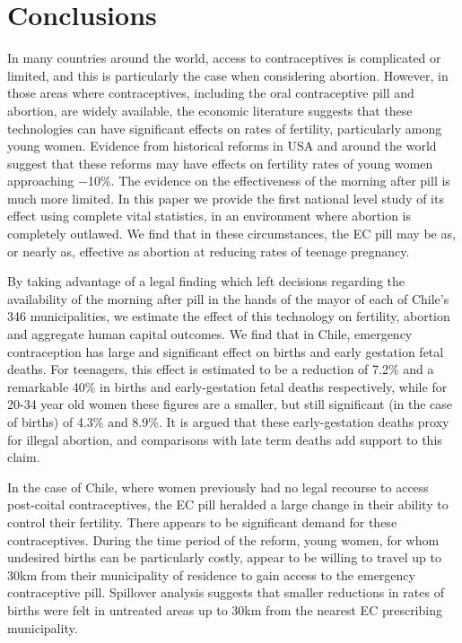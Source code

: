 \section{Conclusions}
\label{TEENscn:conclusion}
In many countries around the world, access to contraceptives is complicated or
limited, and this is particularly the case when considering abortion.  However,
in those areas where contraceptives, including the oral contraceptive pill and 
abortion, are widely available, the economic literature suggests that these
technologies can have significant effects on rates of fertility, particularly
among young women.  Evidence from historical reforms in USA and around the world
suggest that these reforms may have effects on fertility rates of young women 
approaching $-$10\%.  The evidence on the effectiveness of the morning after pill 
is much more limited.  In this paper we provide the first national level study of 
its effect using complete vital statistics, in an environment where abortion is 
completely outlawed. We find that in these circumstances, the EC pill may be as, 
or nearly as, effective as abortion at reducing rates of teenage pregnancy.

By taking advantage of a legal finding which left decisions regarding the 
availability of the morning after pill in the hands of the mayor of each of
Chile's 346 municipalities, we estimate the effect of this technology on 
fertility, abortion and aggregate human capital outcomes. We find that in Chile,
emergency contraception has large and significant effect on births and early 
gestation fetal deaths.  For teenagers, this effect is estimated to be a
reduction of 7.2\% and a remarkable 40\% in births and early-gestation fetal 
deaths respectively, while for 20-34 year old women these figures are a smaller, 
but still significant (in the case of births) of 4.3\% and 8.9\%.  It is argued 
that these early-gestation deaths proxy for illegal abortion, and comparisons 
with late term deaths add support to this claim.

In the case of Chile, where women previously had no legal recourse to access
post-coital contraceptives, the EC pill heralded a large change in their ability
to control their fertility.  There appears to be significant demand for these
contraceptives.  During the time period of the reform, young women, for whom
undesired births can be particularly costly, appear to be willing to travel up
to 30km from their municipality of residence to gain access to the emergency
contraceptive pill.  Spillover analysis suggests that smaller reductions in 
rates of births were felt in untreated areas up to 30km from the nearest EC
prescribing municipality.

